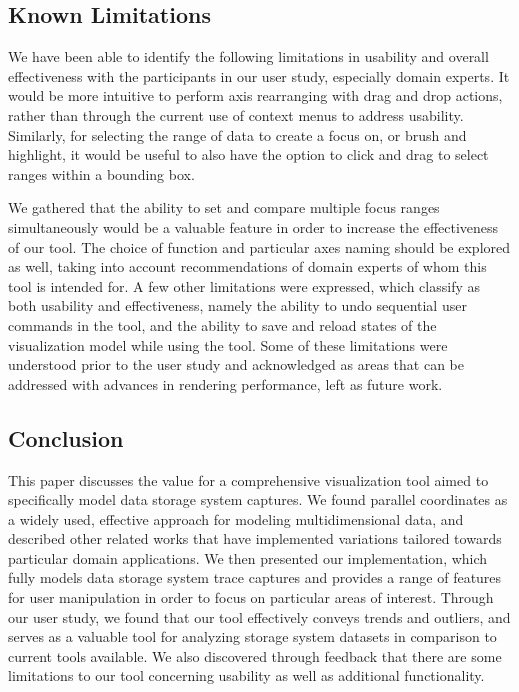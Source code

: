 \documentclass[journal]{vgtc}                %
\begin{document}
\subsection{Known Limitations}
We have been able to identify the following limitations in usability and overall effectiveness with the participants in our user study, especially domain experts. It would be more intuitive to perform axis rearranging with drag and drop actions, rather than through the current use of context menus to address usability. Similarly, for selecting the range of data to create a focus on, or brush and highlight, it would be useful to also have the option to click and drag to select ranges within a bounding box.

We gathered that the ability to set and compare multiple focus ranges simultaneously would be a valuable feature in order to increase the effectiveness of our tool. The choice of function and particular axes naming should be explored as well, taking into account recommendations of domain experts of whom this tool is intended for. A few other limitations were expressed, which classify as both usability and effectiveness, namely the ability to undo sequential user commands in the tool, and the ability to save and reload states of the visualization model while using the tool. Some of these limitations were understood prior to the user study and acknowledged as areas that can be addressed with advances in rendering performance, left as future work. 

\subsection{Conclusion}
This paper discusses the value for a comprehensive visualization tool aimed to specifically model data storage system captures. We found parallel coordinates as a widely used, effective approach for modeling multidimensional data, and described other related works that have implemented variations tailored towards particular domain applications. We then presented our implementation, which fully models data storage system trace captures and provides a range of features for user manipulation in order to focus on particular areas of interest. Through our user study, we found that our tool effectively conveys trends and outliers, and serves as a valuable tool for analyzing storage system datasets in comparison to current tools available. We also discovered through feedback that there are some limitations to our tool concerning usability as well as additional functionality.
\end{document}
